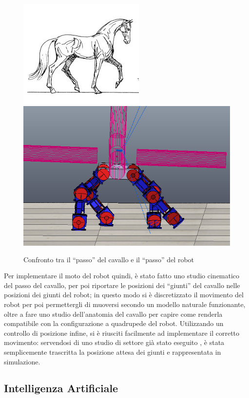 \documentclass[11pt]{article} %
\begin{document}
\begin{figure}[htbp]
\centering
\includegraphics[scale=0.5]{cavallo_passo.jpg}
\qquad\qquad
\includegraphics[scale=0.25]{passo1.png}
\caption{Confronto tra il ``passo'' del cavallo e il ``passo'' del robot}\label{fig:7}
\end{figure}

Per implementare il moto del robot quindi, è stato fatto uno studio cinematico del passo del cavallo, per poi riportare le posizioni dei ``giunti'' del cavallo nelle posizioni dei giunti del robot; in questo modo si è discretizzato il movimento del robot per poi permettergli di muoversi secondo un modello naturale funzionante, oltre a fare uno studio dell'anatomia del cavallo per capire come renderla compatibile con la configurazione a quadrupede del robot.
Utilizzando un controllo di posizione infine, si è riusciti facilmente ad implementare il corretto movimento: servendosi di uno studio di settore già stato eseguito \cite{robot_horse}, è stata semplicemente trascritta la posizione attesa dei giunti e rappresentata in simulazione.

\subsection{Intelligenza Artificiale}
\end{document}
